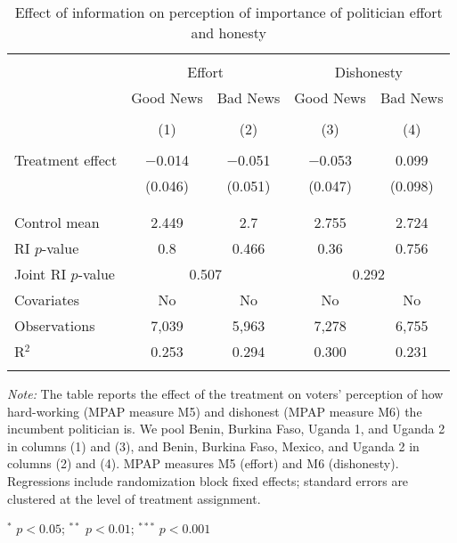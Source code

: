 
\begin{table}[!htbp] \centering 
  \caption{Effect of information on perception of importance of politician effort and honesty} 
  \label{effort_honesty} 
\begin{tabular}{@{\extracolsep{1pt}}lcccc} 
\\[-1.8ex]\hline 
\hline \\[-1.8ex] 
 & \multicolumn{2}{c}{Effort}&\multicolumn{2}{c}{Dishonesty} \\ 
\cline{2-5} 
 & Good News & Bad News & Good News & Bad News \\ 
\\[-1.8ex] & (1) & (2) & (3) & (4)\\ 
\hline \\[-1.8ex] 
 Treatment effect & $-$0.014 & $-$0.051 & $-$0.053 & 0.099 \\ 
  & (0.046) & (0.051) & (0.047) & (0.098) \\ 
  & & & & \\ 
\hline \\[-1.8ex] 
Control mean & 2.449 & 2.7 & 2.755 & 2.724 \\ 
RI $p$-value & 0.8 & 0.466 & 0.36 & 0.756 \\ 
Joint RI $p$-value & \multicolumn{2}{c}{0.507} & \multicolumn{2}{c}{0.292} \\
Covariates & No & No & No & No \\ 
Observations & 7,039 & 5,963 & 7,278 & 6,755 \\ 
R$^{2}$ & 0.253 & 0.294 & 0.300 & 0.231 \\ 
\hline 
\hline \\[-1.8ex] 
\end{tabular} 
\begin{flushleft}\textit{Note:} The table reports the effect of the treatment on voters' perception of how hard-working (MPAP measure M5) and dishonest (MPAP measure M6) the incumbent politician is. We pool Benin, Burkina Faso, Uganda 1, and Uganda 2 in columns (1) and (3), and Benin, Burkina Faso, Mexico, and Uganda 2 in columns (2) and (4). MPAP measures M5 (effort) and M6 (dishonesty). Regressions include randomization block fixed effects; standard errors are clustered at the level of treatment assignment.\end{flushleft}
\begin{flushleft} $^{*}$ $p<0.05$; $^{**}$ $p<0.01$; $^{***}$ $p<0.001$\end{flushleft}
\end{table} 
